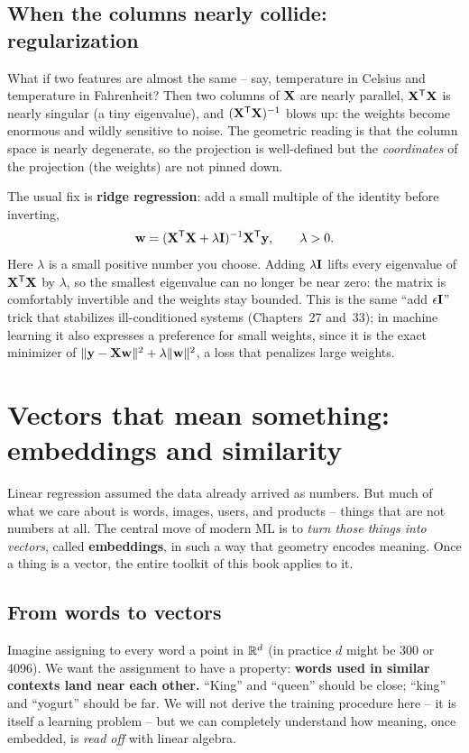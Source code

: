 \subsection{When the columns nearly collide: regularization}

What if two features are almost the same -- say, temperature in Celsius and temperature
in Fahrenheit? Then two columns of $\mathbf{X}$ are nearly parallel, $\mathbf{X}^{\mathsf{T}}\mathbf{X}$ is
nearly singular (a tiny eigenvalue), and $(\mathbf{X}^{\mathsf{T}}\mathbf{X})^{-1}$ blows up: the weights
become enormous and wildly sensitive to noise. The geometric reading is that the column
space is nearly degenerate, so the projection is well-defined but the \emph{coordinates}
of the projection (the weights) are not pinned down.

The usual fix is \textbf{ridge regression}: add a small multiple of the identity
before inverting,
\[
\mathbf{w} = (\mathbf{X}^{\mathsf{T}}\mathbf{X} + \lambda \mathbf{I})^{-1} \mathbf{X}^{\mathsf{T}}\mathbf{y}, \qquad \lambda > 0.
\]
Here $\lambda$ is a small positive number you choose. Adding $\lambda\mathbf{I}$ lifts every
eigenvalue of $\mathbf{X}^{\mathsf{T}}\mathbf{X}$ by $\lambda$, so the
smallest eigenvalue can no longer be near zero: the matrix is comfortably invertible
and the weights stay bounded. This is the same ``add $\epsilon\mathbf{I}$'' trick that
stabilizes ill-conditioned systems (Chapters~27 and~33); in machine learning it also
expresses a preference for small weights, since it is the exact minimizer of
$\lVert\mathbf{y}-\mathbf{X}\mathbf{w}\rVert^2+\lambda\lVert\mathbf{w}\rVert^2$, a loss that penalizes large
weights.

\section{Vectors that mean something: embeddings and similarity}
\label{ch34:embeddings}

Linear regression assumed the data already arrived as numbers. But much of what we care
about is words, images, users, and products -- things that are not numbers at all. The
central move of modern ML is to \emph{turn those things into vectors}, called
\textbf{embeddings}, in such a way that geometry encodes meaning. Once a thing is a
vector, the entire toolkit of this book applies to it.

\subsection{From words to vectors}

Imagine assigning to every word a point in $\mathbb{R}^{d}$ (in practice $d$ might be 300 or
4096). We want the assignment to have a property: \textbf{words used in similar contexts
land near each other.} ``King'' and ``queen'' should be close; ``king'' and ``yogurt''
should be far. We will not derive the training procedure here -- it is itself a learning
problem -- but we can completely understand how meaning, once embedded, is \emph{read
off} with linear algebra.

